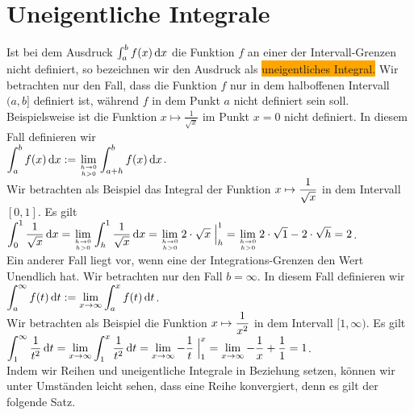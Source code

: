 \section{Uneigentliche Integrale}
Ist bei dem Ausdruck $\int_a^b f(x)\,\textrm{d} x$ die Funktion $f$ an einer der Intervall-Grenzen
nicht definiert, so bezeichnen wir den Ausdruck als \colorbox{orange}{uneigentliches Integral.}  Wir
betrachten nur den Fall, dass die Funktion $f$ nur in dem halboffenen Intervall $(a, b]$
definiert ist, w\"ahrend $f$  in dem Punkt $a$ nicht definiert sein soll.  Beispielsweise
ist die Funktion $x \mapsto \frac{1}{\sqrt{x}}$ im Punkt $x=0$ nicht definiert.  In diesem
Fall definieren wir 
\\[0.2cm]
\hspace*{1.3cm}
$\displaystyle \int_a^b f(x)\, \textrm{d} x := \lim\limits_{h\rightarrow 0 \atop h > 0} \int_{a+h}^b f(x)\, \textrm{d} x$.
\\[0.2cm]
Wir betrachten als Beispiel das Integral der Funktion $\displaystyle x \mapsto \frac{1}{\sqrt{x}}$ in
dem Intervall $[0,1]$.  Es gilt
\\[0.2cm]
\hspace*{1.3cm}
$\displaystyle \int_0^1 \frac{1}{\sqrt{x}}\, \textrm{d} x 
 = \lim\limits_{h\rightarrow 0 \atop h >  0} \int_{h}^1 \frac{1}{\sqrt{x}}\, \textrm{d} x
 = \lim\limits_{h\rightarrow 0 \atop h >  0} 2\cdot\sqrt{x}\; \Big|_h^1
 = \lim\limits_{h\rightarrow 0 \atop h >  0} 2\cdot\sqrt{1} - 2\cdot\sqrt{h} = 2$.
\\[0.2cm]
Ein anderer Fall liegt vor, wenn eine der Integrations-Grenzen den Wert Unendlich hat.
Wir betrachten nur den Fall $b= \infty$.  In diesem Fall definieren wir
\\[0.2cm]
\hspace*{1.3cm}
$\displaystyle \int_a^\infty f(t)\, \textrm{d} t := \lim\limits_{x\rightarrow \infty} \int_{a}^x f(t)\, \textrm{d} t$.
\\[0.2cm]
Wir betrachten als Beispiel die Funktion $\displaystyle x \mapsto \frac{1}{x^2}$ in dem Intervall
$[1,\infty)$. Es gilt
\\[0.2cm]
\hspace*{1.3cm}
$\displaystyle \int_1^\infty \frac{1}{t^2}\, \textrm{d} t = 
\lim\limits_{x\rightarrow \infty} \int_{1}^x \frac{1}{t^2}\, \textrm{d} t =
\lim\limits_{x\rightarrow \infty} - \frac{1}{t}\;\Big|_1^x =
\lim\limits_{x\rightarrow \infty} - \frac{1}{x} + \frac{1}{1}  = 1
$.
\\[0.2cm]
Indem wir Reihen und uneigentliche Integrale in Beziehung setzen, k\"onnen wir unter
Umst\"anden leicht sehen, dass eine Reihe konvergiert, denn es gilt der folgende Satz.



